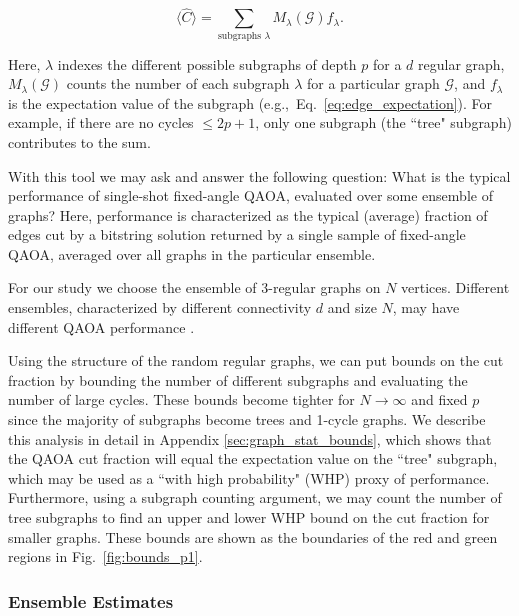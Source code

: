 \documentclass[prb,reprint,nofootinbib,longbibliography,superscriptaddress]{revtex4-1}
\begin{document}
\begin{equation}
    \langle \hat C\rangle = \sum_{\text{subgraphs } \lambda}M_\lambda(\mathcal G) f_\lambda.
\end{equation}

Here, $\lambda$ indexes the different possible subgraphs of depth $p$ for a $d$ regular graph, $M_\lambda(\mathcal G)$ counts the number of each subgraph $\lambda$ for a particular graph $\mathcal G$, and $f_\lambda$ is the expectation value of the subgraph (e.g.,~Eq.~\eqref{eq:edge_expectation}). For example, if there are no cycles $\leq 2p+1$,  only one subgraph (the ``tree" subgraph)  contributes to the sum.

With this tool we may ask and answer the following question: What is the typical performance of single-shot fixed-angle QAOA, evaluated over some ensemble of graphs? Here, performance is characterized as the typical (average) fraction of edges cut by a bitstring solution returned by a single sample of fixed-angle QAOA, averaged over all graphs in the particular ensemble. 

For our study we choose the ensemble of $3$-regular graphs on $N$ vertices. Different ensembles, characterized by different connectivity $d$ and size $N$, may have different QAOA performance \cite{herrman2021impact, shaydulin2021qaoakit}.

Using the structure of the random regular graphs, we can put bounds on the cut fraction by bounding the number of different subgraphs and evaluating the number of large cycles. 
These bounds become  tighter for $N\longrightarrow\infty$ and fixed $p$ since the majority of subgraphs become trees and 1-cycle graphs.
We describe this analysis in detail in Appendix \ref{sec:graph_stat_bounds}, which shows that the QAOA cut fraction will equal the expectation value on the ``tree" subgraph, which may be used as a ``with high probability" (WHP) proxy of performance. Furthermore, using a subgraph counting argument, we may count the number of tree subgraphs to find an upper and lower WHP bound on the cut fraction for smaller graphs. These bounds are shown as the boundaries of the red and green regions in Fig.~\ref{fig:bounds_p1}.








\subsubsection{Ensemble Estimates}\label{sec:ensemble_estimates}
\end{document}

